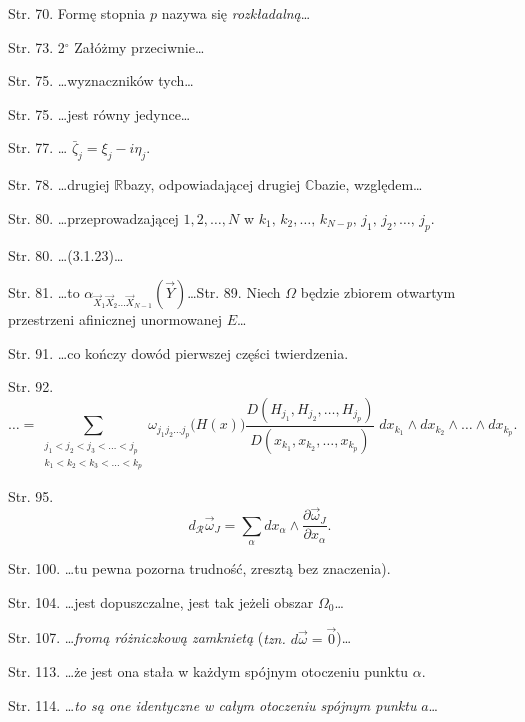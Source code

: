 \documentclass[a4paper,11pt]{article}
\begin{document}
\start Str. 70. Formę stopnia $p$ nazywa się \emph{rozkładalną}\ldots

\start Str. 73. 2$^{\circ}$ Załóżmy przeciwnie\ldots

\start Str. 75. \ldots wyznaczników tych\ldots

\start Str. 75. \ldots jest równy jedynce\ldots

\start Str. 77. \ldots
$\bar{ \zeta }_{ j } = \xi_{ j } - i \eta_{ j }$.

\start Str. 78. \ldots drugiej $\mathbb{R}$\dywiz bazy, odpowiadającej
drugiej $\mathbb{C}$\dywiz bazie, względem\ldots

\start Str. 80. \ldots przeprowadzającej $1, 2, \ldots, N$ w
$k_{ 1 }, \, k_{ 2 }, \ldots, \, k_{ N - p }, \, j_{ 1 }, \, j_{ 2 },
\ldots, \, j_{ p }$.

\start Str. 80. \ldots (3.1.23)\ldots

\start Str. 81. \ldots to
$\alpha_{ \vec{ X }_{ 1 } \vec{ X }_{ 2 } \ldots \vec{ X }_{ N - 1 } }
( \vec{ Y } )$\ldots \start Str. 89. Niech $\Omega$ będzie zbiorem
otwartym przestrzeni af\mbox{}inicznej unormowanej $E$\ldots

\start Str. 91. \ldots co kończy dowód pierwszej części twierdzenia.

\start Str. 92. $$\ldots = \sum_{ \substack{ j_{ 1 } < j_{ 2 } < j_{ 3 } < \ldots < j_{ p } \\
    k_{ 1 } < k_{ 2 } < k_{ 3 } < \ldots < k_{ p } } } \omega_{ j_{ 1
  } j_{ 2 } \ldots j_{ p } } \big( H( x ) \big) \frac{ D( H_{ j_{ 1 }
  }, H_{ j_{ 2 } }, \ldots, H_{ j_{ p } } ) }{ D( x_{ k_{ 1 } }, x_{
    k_{ 2 } }, \ldots, x_{ k_{ p } } ) } \; dx_{ k_{ 1 } } \wedge dx_{
  k_{ 2 } } \wedge \ldots \wedge dx_{ k_{ p } } \textrm{.}$$

\start Str. 95.
$$d_{ \mathcal{ R } } \vec{ \omega }_{ J } = \sum_{ \alpha } dx_{
  \alpha} \wedge \frac{ \partial \vec{ \omega }_{ J } }{ \partial x_{
    \alpha } } \textrm{.}$$

\start Str. 100. \ldots tu pewna pozorna trudność, zresztą bez
znaczenia).

\start Str. 104. \ldots jest dopuszczalne, jest tak jeżeli obszar
$\Omega_{ 0 }$\ldots

\start Str. 107. \ldots\emph{fromą różniczkową zamknietą} (\emph{tzn.
  $d\vec{ \omega } = \vec{ 0 }$})\ldots

\start Str. 113. \ldots że jest ona stała w każdym spójnym otoczeniu
punktu $\alpha$.

\start Str. 114. \ldots\emph{to są one identyczne w całym otoczeniu
  spójnym punktu} $a$\ldots
\end{document}

